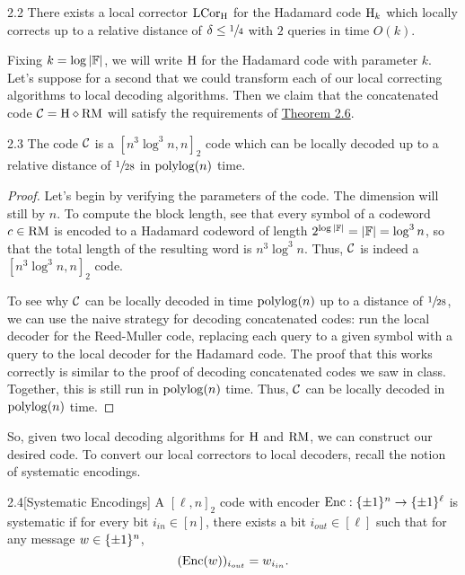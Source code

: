 \documentclass[11pt]{article}
\begin{document}
\begin{claim}{2.2}
    There exists a local corrector ${\textup{LCor}}_{\mathrm{H}}$ for the Hadamard code $\mathrm{H}_k$ which locally corrects up to a relative distance of $\delta \leq \sfrac{1}{4}$ with $2$ queries in time $O(k)$.
\end{claim}

Fixing $k = \log |\mathbb{F}|$, we will write $\mathrm{H}$ for the Hadamard code with parameter $k$. Let's suppose for a second that we could transform each of our local correcting algorithms to local decoding algorithms. Then we claim that the concatenated code $\mathcal{C} = \mathrm{H} \diamond \mathrm{RM}$ will satisfy the requirements of \hyperref[t-2-6]{Theorem 2.6}.

\begin{claim}{2.3}
    The code $\mathcal{C}$ is a $[n^3\log^3 n, n]_2$ code which can be locally decoded up to a relative distance of $\sfrac{1}{28}$ in $\mathrm{polylog}(n)$ time.
\end{claim}

\begin{proof}
    Let's begin by verifying the parameters of the code. The dimension will still by $n$. To compute the block length, see that every symbol of a codeword $c \in \mathrm{RM}$ is encoded to a Hadamard codeword of length $2^{\log |\mathbb{F}|} = |\mathbb{F}| = \log^3 n$, so that the total length of the resulting word is $n^3 \log^3 n$. Thus, $\mathcal{C}$ is indeed a $[n^3 \log^3 n, n]_2$ code.

    To see why $\mathcal{C}$ can be locally decoded in time $\mathrm{polylog}(n)$ up to a distance of $\sfrac{1}{28}$, we can use the naive strategy for decoding concatenated codes: run the local decoder for the Reed-Muller code, replacing each query to a given symbol with a query to the local decoder for the Hadamard code. The proof that this works correctly is similar to the proof of decoding concatenated codes we saw in class. Together, this is still run in $\mathrm{polylog}(n)$ time. Thus, $\mathcal{C}$ can be locally decoded in $\mathrm{polylog}(n)$ time.
\end{proof}

So, given two local decoding algorithms for $\mathrm{H}$ and $\mathrm{RM}$, we can construct our desired code. To convert our local correctors to local decoders, recall the notion of systematic encodings.

\begin{definition}{2.4}[Systematic Encodings]
    A $[\ell, n]_2$  code with encoder $\mathrm{Enc} : \{\pm 1\}^{n} \rightarrow \{\pm 1\}^{\ell}$ is systematic if for every bit $i_{in} \in [n]$, there exists a bit $i_{out} \in [\ell]$ such that for any message $w \in \{\pm 1\}^n$, 
    \begin{equation*}
        (\mathrm{Enc}(w))_{i_{out}} = w_{i_{in}}.
    \end{equation*}
\end{definition}
\end{document}
